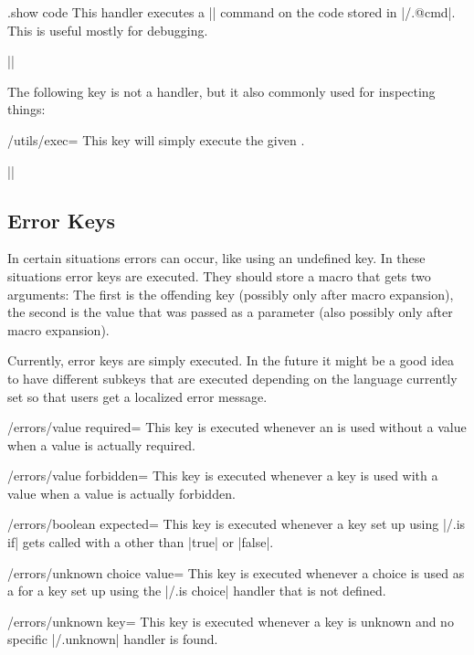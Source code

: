 \begin{handler}{{.show code}}
  This handler executes a |\show| command on the code stored in
  |/.@cmd|. This is useful mostly for debugging.

  \example ||
\end{handler}

The following key is not a handler, but it also commonly used for
inspecting things:
\begin{key}{/utils/exec=}
  This key will simply execute the given .

  \example ||
\end{key}


\subsection{Error Keys}

In certain situations errors can occur, like using an undefined
key. In these situations error keys are executed. They should store a
macro that gets two arguments: The first is the offending key
(possibly only after macro expansion), the second is the value that
was passed as a parameter (also possibly only after macro expansion).

Currently, error keys are simply executed. In the future it might be a
good idea to have different subkeys that are executed depending on the
language currently set so that users get a localized error message.

\begin{key}{/errors/value required=}
  This key is executed whenever an  is used
  without a value when a value is actually required.
\end{key}

\begin{key}{/errors/value forbidden=}
  This key is executed whenever a key is used with a value when a
  value is actually forbidden.
\end{key}

\begin{key}{/errors/boolean expected=}
  This key is executed whenever a key set up using |/.is if| gets called
  with a  other than |true| or |false|.
\end{key}

\begin{key}{/errors/unknown choice value=}
  This key is executed whenever a choice is used as a  for
  a key set up using the |/.is choice| handler that is not defined.
\end{key}

\begin{key}{/errors/unknown key=}
  This key is executed whenever a key is unknown and no specific
  |/.unknown| handler is found.
\end{key}


